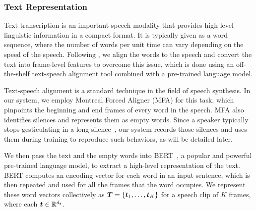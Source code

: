 \subsubsection{Text Representation}
Text transcription is an important speech modality that provides high-level linguistic information in a compact format. It is typically given as a word sequence, where the number of words per unit time can vary depending on the speed of the speech. Following \cite{kucherenko2020gesticulator}, we align the words to the speech and convert the text into frame-level features to overcome this issue, which is done using an off-the-shelf text-speech alignment tool combined with a pre-trained language model.

Text-speech alignment is a standard technique in the field of speech synthesis. In our system, we employ Montreal Forced Aligner (MFA) \cite{mcauliffe2017montreal} for this task, which pinpoints the beginning and end frames of every word in the speech. MFA also identifies silences and represents them as empty words. Since a speaker typically stops gesticulating in a long silence~\cite{graziano2018silence}, our system records those silences and uses them during training to reproduce such behaviors, as will be detailed later.

We then pass the text and the empty words into BERT~\cite{devlin2019bert}, a popular and powerful pre-trained language model, to extract a high-level representation of the text. BERT computes an encoding vector for each word in an input sentence, which is then repeated and used for all the frames that the word occupies. We represent these word vectors collectively as $\bm{T}=\{\bm{t}_1,\dots,\bm{t}_K\}$ for a speech clip of $K$ frames, where each $\bm{t}\in\mathbb{R}^{d_t}$.

